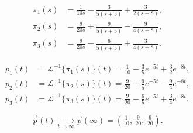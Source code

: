 \[
	\begin{aligned}
		\pi_1(s) & = \frac{1}{10s} - \frac{3}{5(s+5)} + \frac{3}{2(s+8)}, \\
		\pi_2(s) & = \frac{9}{20s} + \frac{9}{5(s+5)} - \frac{9}{4(s+8)}, \\
		\pi_3(s) & = \frac{9}{20s} - \frac{6}{5(s+5)} + \frac{3}{4(s+8)}.
	\end{aligned}
\]

\[
	\begin{aligned}
		p_1(t) & = \mathcal{L}^{-1}\{\pi_1(s)\}(t)
		= \frac{1}{10} - \frac{3}{5}e^{-5t} + \frac{3}{2}e^{-8t}, \\
		p_2(t) & = \mathcal{L}^{-1}\{\pi_2(s)\}(t)
		= \frac{9}{20} + \frac{9}{5}e^{-5t} - \frac{9}{4}e^{-8t}, \\
		p_3(t) & = \mathcal{L}^{-1}\{\pi_3(s)\}(t)
		= \frac{9}{20} - \frac{6}{5}e^{-5t} + \frac{3}{4}e^{-8t}.
	\end{aligned}
\]

\[
	\vec{p}(t)\xrightarrow [t\to\infty]{}\vec{p}(\infty)=\left(\tfrac{1}{10},\,\tfrac{9}{20},\,\tfrac{9}{20}\right).
\]
